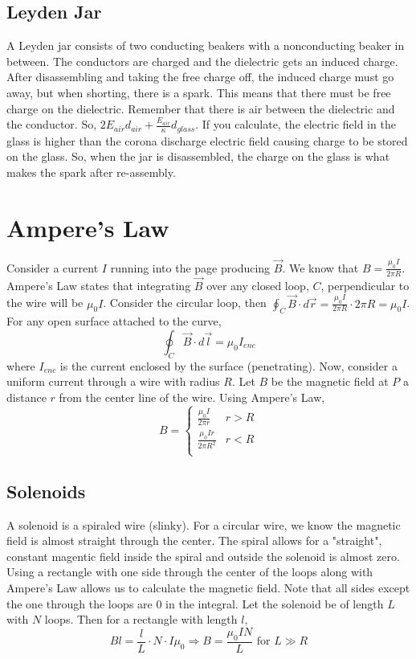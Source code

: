 \documentclass{article}
\begin{document}
\subsection{Leyden Jar}
A Leyden jar consists of two conducting beakers with a nonconducting beaker in between. The conductors are charged 
and the dielectric gets an induced charge. After disassembling and taking the free charge off, the induced charge must go away,
but when shorting, there is a spark. This means that there must be free charge on the dielectric. Remember that there is 
air between the dielectric and the conductor. So, $2E_{air}d_{air}+\frac{E_{air}}{\kappa}d_{glass}$. If you calculate,
the electric field in the glass is higher than the corona discharge electric field causing charge to be stored on the glass.
So, when the jar is disassembled, the charge on the glass is what makes the spark after re-assembly.

\section{Ampere's Law}
Consider a current $I$ running into the page producing $\vec{B}$. We know that $B=\frac{\mu_{0}I}{2\pi R}$. 
Ampere's Law states that integrating $\vec{B}$ over any closed loop, $C$, perpendicular to the wire will be $\mu_{0}I$.
Consider the circular loop, then $\oint_{C}\vec{B}\cdot d\vec{r}=\frac{\mu_{0}I}{2\pi R}\cdot 2\pi R=\mu_{0}I$.
For any open surface attached to the curve,
$$\oint_{C}\vec{B}\cdot d\vec{l}=\mu_{0}I_{enc}$$
where $I_{enc}$ is the current enclosed by the surface (penetrating). Now, consider a uniform current through a wire with radius $R$.
Let $B$ be the magnetic field at $P$ a distance $r$ from the center line of the wire. Using Ampere's Law,
\[
B=
\begin{cases}
    \frac{\mu_{0}I}{2\pi r} & r>R \\
    \frac{\mu_{0}Ir}{2\pi R^{2}} & r<R \\ 
\end{cases}
\]

\subsection{Solenoids}
A solenoid is a spiraled wire (slinky). For a circular wire, we know the magnetic field is almost straight through the center.
The spiral allows for a "straight", constant magentic field inside the spiral and outside the solenoid is almost zero. 
Using a rectangle with one side through the center
of the loops along with Ampere's Law allows us to calculate the magnetic field. Note that all sides except the one through the loops
are $0$ in the integral. Let the solenoid be of length $L$ with $N$ loops. Then for a rectangle with length $l$,
$$Bl=\frac{l}{L}\cdot N\cdot I\mu_{0}\Rightarrow B=\frac{\mu_{0}IN}{L}\text{ for } L\gg R$$
\end{document}
